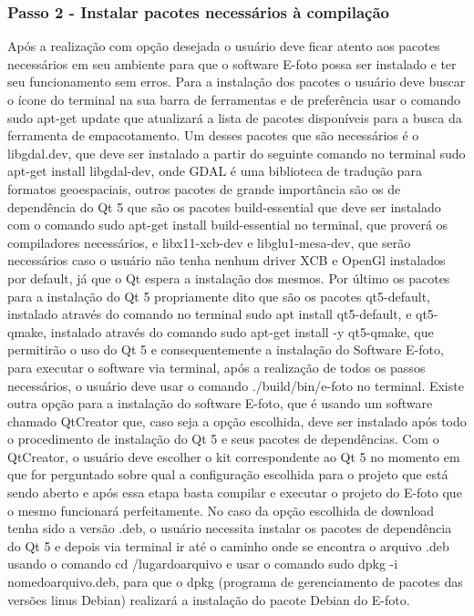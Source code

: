   \subsubsection{Passo 2 - Instalar pacotes necessários à compilação}  %
    Após a realização com opção desejada o usuário deve ficar atento aos pacotes necessários em seu ambiente para que o software E-foto possa ser instalado e ter seu funcionamento sem erros. Para a instalação dos pacotes o usuário deve buscar o ícone do terminal na sua barra de ferramentas e de preferência usar o comando sudo apt-get update que atualizará a lista de pacotes disponíveis para a busca da ferramenta de empacotamento. Um desses pacotes que são necessários é o libgdal.dev, que deve ser instalado a partir do seguinte comando no  terminal sudo apt-get install libgdal-dev, onde GDAL é uma biblioteca de tradução para formatos geoespaciais, outros pacotes de grande importância são os de dependência do Qt 5 que são os pacotes build-essential que deve ser instalado com o comando sudo apt-get install build-essential no terminal, que proverá os compiladores necessários, e libx11-xcb-dev e libglu1-mesa-dev, que serão necessários caso o usuário não tenha nenhum driver XCB e OpenGl instalados por default, já que o Qt espera a instalação dos mesmos. Por último os pacotes para a instalação do Qt 5 propriamente dito que são os pacotes qt5-default, instalado através do comando no terminal sudo apt install qt5-default, e qt5-qmake, instalado através do comando sudo apt-get install -y qt5-qmake, que permitirão o uso do Qt 5 e consequentemente a instalação do Software E-foto, para executar o software via terminal, após a realização de todos os passos necessários, o usuário deve usar o comando ./build/bin/e-foto no terminal. Existe outra opção para a instalação do software E-foto, que é usando um software chamado QtCreator que, caso seja a opção escolhida, deve ser instalado após todo o procedimento de instalação do Qt 5 e seus pacotes de dependências. Com o QtCreator, o usuário deve escolher o kit correspondente ao Qt 5 no momento em que for perguntado sobre qual a configuração escolhida para o projeto que está sendo aberto e após essa etapa basta compilar e executar o projeto do E-foto que o mesmo funcionará perfeitamente.
No caso da opção escolhida de download tenha sido a versão .deb, o usuário necessita instalar os pacotes de dependência do Qt 5 e depois via terminal ir até o caminho onde se encontra o arquivo .deb usando o comando cd /lugardoarquivo e usar o comando sudo dpkg -i nomedoarquivo.deb, para que o dpkg (programa de gerenciamento de pacotes das versões linus Debian) realizará a instalação do pacote Debian do E-foto.

